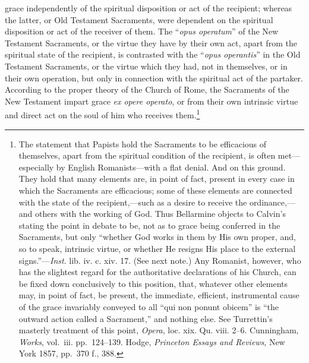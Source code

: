 \documentclass[english,]{book}
\begin{document}
grace independently of the spiritual disposition or act of the recipient; whereas the latter, or Old Testament Sacraments, were dependent on the spiritual disposition or act of the receiver of them. The ``\emph{opus operatum}'' of the New Testament Sacraments, or the virtue they have by their own act, apart from the spiritual state of the recipient, is contrasted with the ``\emph{opus operantis}'' in the Old Testament Sacraments, or the virtue which they had, not in themselves, or in their own operation, but only in connection with the spiritual act of the partaker. According to the proper theory of the Church of Rome, the Sacraments of the New Testament impart grace \emph{ex opere operato}, or from their own intrinsic virtue and direct act on the soul of him who receives them.\footnote{The statement that Papists hold the Sacraments to be efficacious of themselves, apart from the spiritual condition of the recipient, is often met---especially by English Romanists---with a flat denial. And on this ground. They hold that many elements are, in point of fact, present in every case in which the Sacraments are efficacious; some of these elements are connected with the state of the recipient,---such as a desire to receive the ordinance,---and others with the working of God. Thus Bellarmine objects to Calvin's stating the point in debate to be, not as to grace being conferred in the Sacraments, but only ``whether God works in them by His own proper, and, so to speak, intrinsic virtue, or whether He resigns His place to the external signs.''---\emph{Inst}. lib. iv. c. xiv. 17. (See next note.) Any Romanist, however, who has the slightest regard for the authoritative declarations of his Church, can be fixed down conclusively to this position, that, whatever other elements may, in point of fact, be present, the immediate, efficient, instrumental cause of the grace invariably conveyed to all ``qui non ponunt obicem'' is ``the outward action called a Sacrament,'' and nothing else. See Turrettin's masterly treatment of this point, \emph{Opera}, loc. xix. Qu. viii. 2--6. Cunningham, \emph{Works}, vol.~iii. pp.~124--139. Hodge, \emph{Princeton Essays and Reviews}, New York 1857, pp.~370 f., 388.}
\end{document}
